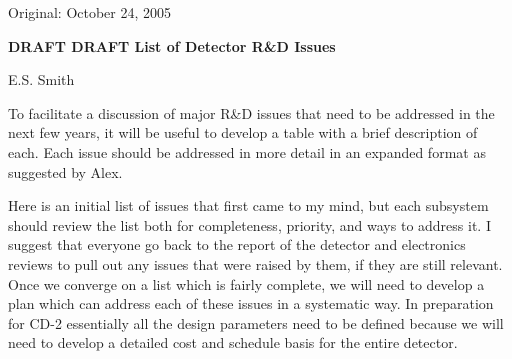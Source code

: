 \documentclass[12pt,dvips]{article}
\begin{document}
\begin{flushright}
Original: October 24, 2005
\end{flushright}
 

\begin{center}
{\Large \bf DRAFT DRAFT List of Detector R\&D Issues} \\
\end{center}

\begin{center}
{\sc  E.S. Smith}\\
\end{center}

To facilitate a discussion of major R\&D issues that need to be addressed
in the next few years, it will be useful to develop a table with
a brief description of each. Each issue should be addressed in more detail in an
expanded format as suggested by Alex.

Here is an initial list of issues that first came to my mind, but each subsystem
should review the list both for completeness, priority, and ways to address it.
I suggest that everyone go back to the report of the detector and electronics  reviews 
to pull out
any issues that were raised by them, if they are still relevant.
Once we converge on a list which is fairly complete, we will need to develop a 
plan which can address each of these issues in a systematic way.
In preparation for CD-2 essentially all the design parameters need to be defined
because we will need to develop a detailed cost and schedule basis for the
entire detector. 
\end{document}

